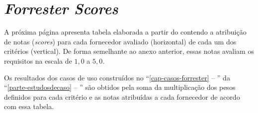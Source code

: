 \chapter{\emph{Forrester Scores}}
\label{anexo-tabelafw}


A próxima página apresenta tabela elaborada a partir do \relatorioFCM contendo a atribuição de notas (\emph{scores}) para cada fornecedor avaliado (horizontal) de cada um dos critérios (vertical). De forma semelhante ao anexo anterior, essas notas avaliam os requisitos na escala de $1,0$ a $5,0$.

Os resultados dos casos de uso construídos no ``\autoref{cap-casos-forrester} -- '' da ``\autoref{parte-estudosdecaso} -- '' são obtidos pela soma da multiplicação dos pesos definidos para cada critério e as notas atribuídas a cada fornecedor de acordo com essa tabela. 

\thispagestyle{empty}
\begin{landscape}
    
\end{landscape}
